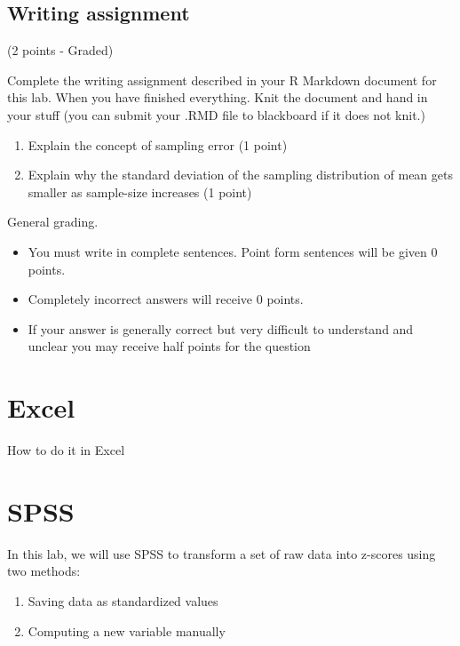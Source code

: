 \documentclass[
]{book}
\providecommand{\tightlist}{%
  \setlength{\itemsep}{0pt}\setlength{\parskip}{0pt}}
\begin{document}
\hypertarget{writing-assignment-3}{%
\subsection{Writing assignment}\label{writing-assignment-3}}

(2 points - Graded)

Complete the writing assignment described in your R Markdown document for this lab. When you have finished everything. Knit the document and hand in your stuff (you can submit your .RMD file to blackboard if it does not knit.)

\begin{enumerate}
\def\labelenumi{\arabic{enumi}.}
\item
  Explain the concept of sampling error (1 point)
\item
  Explain why the standard deviation of the sampling distribution of mean gets smaller as sample-size increases (1 point)
\end{enumerate}

General grading.

\begin{itemize}
\tightlist
\item
  You must write in complete sentences. Point form sentences will be given 0 points.
\item
  Completely incorrect answers will receive 0 points.
\item
  If your answer is generally correct but very difficult to understand and unclear you may receive half points for the question
\end{itemize}

\hypertarget{excel-4}{%
\section{Excel}\label{excel-4}}

How to do it in Excel

\hypertarget{spss-4}{%
\section{SPSS}\label{spss-4}}

In this lab, we will use SPSS to transform a set of raw data into z-scores using two methods:

\begin{enumerate}
\def\labelenumi{\arabic{enumi}.}
\tightlist
\item
  Saving data as standardized values
\item
  Computing a new variable manually
\end{enumerate}
\end{document}
